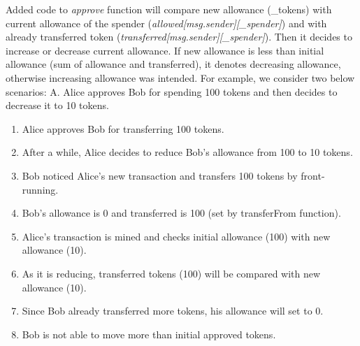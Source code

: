 Added code to \textit{approve} function will compare new allowance (\_tokens) with current allowance of the spender (\textit{allowed[msg.sender][\_spender]}) and with already transferred token (\textit{transferred[msg.sender][\_spender]}). Then it decides to increase or decrease current allowance. If new allowance is less than initial allowance (sum of allowance and transferred), it denotes decreasing allowance, otherwise increasing allowance was intended. For example, we consider two below scenarios:\newline\newline
\noindent A. Alice approves Bob for spending 100 tokens and then decides to decrease it to 10 tokens.
\begin{enumerate}
	\item Alice approves Bob for transferring 100 tokens.
	\item After a while, Alice decides to reduce Bob’s allowance from 100 to 10 tokens.
	\item Bob noticed Alice’s new transaction and transfers 100 tokens by front-running.
	\item Bob’s allowance is 0 and transferred is 100 (set by transferFrom function).
	\item Alice’s transaction is mined and checks initial allowance (100) with new allowance (10).
	\item As it is reducing, transferred tokens (100) will be compared with new allowance (10).
	\item Since Bob already transferred more tokens, his allowance will set to 0.
	\item Bob is not able to move more than initial approved tokens.\newline
\end{enumerate}

